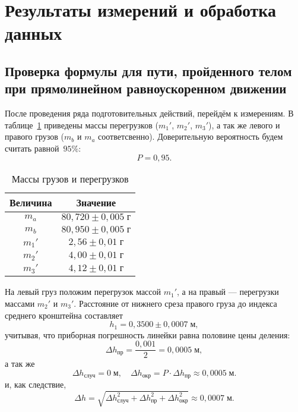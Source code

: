\section{Результаты измерений и обработка данных}

\subsection{Проверка формулы для пути, пройденного телом при прямолинейном равноускоренном движении}

После проведения ряда подготовительных действий, перейдём к измерениям. В таблице~\ref{TbOne} приведены массы перегрузков ($m_1'$, $m_2'$, $m_3'$), а так же левого и правого грузов ($m_b$ и $m_a$ соответсвенно). Доверительную вероятность будем считать равной~$95\%$:
\[
P=0{,}95.
\]

\begin{table}[h!]
	\begin{center}
	\begin{tabular}{|c|c|}
		\hline
		Величина & Значение \\
		\hline
		\hline
		$m_a$ & $80{,}720\pm0{,}005\;\text{г}$ \\
		\hline
		$m_b$ & $80{,}950\pm0{,}005\;\text{г}$ \\
		\hline
		$m_1'$ & $2{,}56\pm0{,}01\;\text{г}$ \\
		\hline
		$m_2'$ & $4{,}00\pm0{,}01\;\text{г}$ \\
		\hline
		$m_3'$ & $4{,}12\pm0{,}01\;\text{г}$ \\
		\hline
	\end{tabular}
	\caption{Массы грузов и перегрузков}\label{TbOne}
	\end{center}
\end{table}

На левый груз положим перегрузок массой $m_1'$, а на правый --- перегрузки массами $m_2'$ и $m_3'$. Расстояние от нижнего среза правого
груза до индекса среднего кронштейна составляет
\[
h_1=0{,}3500\pm0{,}0007\;\text{м},
\]
учитывая, что приборная погрешность линейки равна половине цены деления:
\[
\Delta h_\text{пр}=\frac{0{,}001}{2}=0{,}0005\;\text{м},
\]
а так же
\[
\Delta h_\text{случ}=0\;\text{м},\quad\Delta h_\text{окр}=P\cdot\Delta h_\text{пр}\approx0{,}0005\;\text{м}.
\]
и, как следствие,
\[
\Delta h=\sqrt{\Delta h_\text{случ}^2+\Delta h_\text{пр}^2+\Delta h_\text{окр}^2}\approx0{,}0007\;\text{м}.
\]

